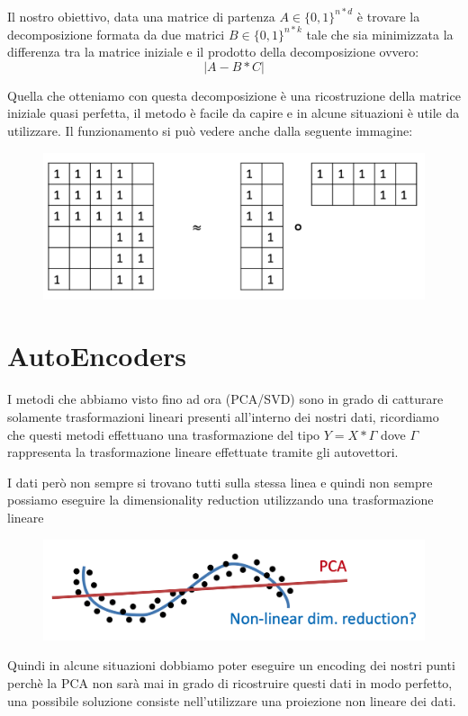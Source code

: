 \documentclass[14pt]{extreport}
\begin{document}
Il nostro obiettivo, data una matrice di partenza $A \in \{0,1\}^{n*d}$ è trovare la decomposizione formata da due matrici $B \in \{0,1\}^{n*k}$ tale
che sia minimizzata la differenza tra la matrice iniziale e il prodotto della decomposizione ovvero: $$|A-B*C|$$

Quella che otteniamo con questa decomposizione è una ricostruzione della matrice iniziale quasi perfetta, il metodo è facile da capire e in alcune
situazioni è utile da utilizzare. Il funzionamento si può vedere anche dalla seguente immagine:

\begin{figure}[H]
	\centering
	\includegraphics[width=0.7\linewidth]{530.jpeg}
\end{figure}

\section{AutoEncoders}

I metodi che abbiamo visto fino ad ora (PCA/SVD) sono in grado di catturare solamente trasformazioni lineari presenti all'interno dei nostri dati,
ricordiamo che questi metodi effettuano una trasformazione del tipo $Y = X * \Gamma$ dove $\Gamma$ rappresenta la trasformazione lineare effettuate
tramite gli autovettori.

I dati però non sempre si trovano tutti sulla stessa linea e quindi non sempre possiamo eseguire la dimensionality reduction utilizzando una
trasformazione lineare

\begin{figure}[H]
	\centering
	\includegraphics[width=0.7\linewidth]{531.jpeg}
\end{figure}

Quindi in alcune situazioni dobbiamo poter eseguire un encoding dei nostri punti perchè la PCA non sarà mai in grado di ricostruire questi dati in
modo perfetto, una possibile soluzione consiste nell'utilizzare una proiezione non lineare dei dati.
\end{document}
